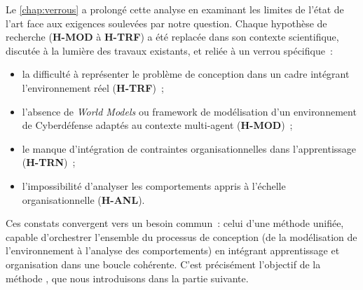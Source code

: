 \noindent
Le \autoref{chap:verrous} a prolongé cette analyse en examinant les limites de l'état de l'art face aux exigences soulevées par notre question. Chaque hypothèse de recherche (\textbf{H-MOD} à \textbf{H-TRF}) a été replacée dans son contexte scientifique, discutée à la lumière des travaux existants, et reliée à un verrou spécifique~:
\begin{itemize}
  \item la difficulté à représenter le problème de conception dans un cadre intégrant l'environnement réel (\textbf{H-TRF})~;
  \item l'absence de \textit{World Models} ou framework de modélisation d'un environnement de Cyberdéfense adaptés au contexte multi-agent (\textbf{H-MOD})~;
  \item le manque d'intégration de contraintes organisationnelles dans l'apprentissage (\textbf{H-TRN})~;
  \item l'impossibilité d'analyser les comportements appris à l'échelle organisationnelle (\textbf{H-ANL}).
\end{itemize}

\medskip

\noindent
Ces constats convergent vers un besoin commun~: celui d'une méthode unifiée, capable d'orchestrer l'ensemble du processus de conception (de la modélisation de l'environnement à l'analyse des comportements) en intégrant apprentissage et organisation dans une boucle cohérente. C'est précisément l'objectif de la méthode , que nous introduisons dans la partie suivante.
